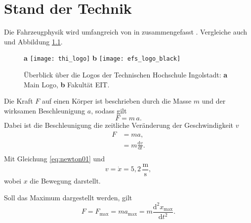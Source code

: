 \chapter{Stand der Technik}

\blindtext

Die Fahrzeugphysik wird umfangreich von \citeauthor{Mitschke.2014} in  zusammengefasst \cite{Mitschke.2014}. 
Vergleiche auch \cite{Romberg.2011} und Abbildung \ref{fig:logoTH}. 


\begin{figure}[h!]
  \centering
  \textbf{a}
  \texttt{[image: thi\_logo]}
  \hfil
  \textbf{b}
  \texttt{[image: efs\_logo\_black]}
  \caption[Logos der Hochschule]{Überblick über die Logos der Technischen Hochschule Ingolstadt: \newline \textbf{a} Main Logo, \textbf{b} Fakultät EIT.}
  \label{fig:logoTH}
\end{figure}

\blindtext

Die Kraft $F$ auf einen Körper ist beschrieben durch die Masse $m$ und der wirksamen Beschleunigung $a$, sodass gilt
\begin{equation}
  F = m \, a.
\end{equation}
Dabei ist die Beschleunigung die zeitliche Veränderung der Geschwindigkeit $v$
\begin{equation}
  \begin{aligned}
    F & = m a, \\
      & = m \frac{\text{d} v}{\text{d} t}.\\
  \end{aligned}
  \label{eq:newton01}
\end{equation}
%
Mit Gleichung \eqref{eq:newton01} und $$ v = \dot{x} = 5{,}2 \, \frac{\text{m}}{\text{s}}, $$ wobei $x$ die Bewegung darstellt.

Soll das Maximum dargestellt werden, gilt
$$ F = F_\text{max} = m a_\text{max} = m \frac{\text{d}^2 x_\text{max}}{\text{d} t^2}.$$



















